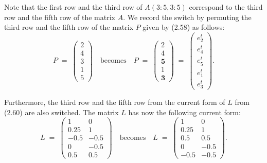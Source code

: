 Note that the first row and the third row of $A(3:5,3:5)$ correspond to the
third row and the fifth row of the matrix $A$. We record the switch by
permuting the third row and the fifth row of the matrix $P$ given by (2.58)
as follows:
\begin{equation}
P \;=\; \begin{pmatrix} 2\\ 4\\ 3\\ 1\\ 5 \end{pmatrix}
\quad \text{becomes} \quad
P \;=\; \begin{pmatrix} 2\\ 4\\ \mathbf{5}\\ 1\\ \mathbf{3} \end{pmatrix}
\;=\;
\begin{pmatrix} e_2^t\\ e_4^t\\ e_5^t\\ e_1^t\\ e_3^t \end{pmatrix}.
\end{equation}

Furthermore, the third row and the fifth row from the current form of $L$
from (2.60) are also switched. The matrix $L$ has now the following current
form:
\begin{equation}
L \;=\; \begin{pmatrix} 1 & 0\\ 0.25 & 1\\ -0.5 & -0.5\\ 0 & -0.5\\ 0.5 & 0.5 \end{pmatrix}
\quad \text{becomes} \quad
L \;=\; \begin{pmatrix} 1 & 0\\ 0.25 & 1\\ \mathbf{0.5} & \mathbf{0.5}\\ 0 & -0.5\\ \mathbf{-0.5} & \mathbf{-0.5} \end{pmatrix}.
\end{equation}

